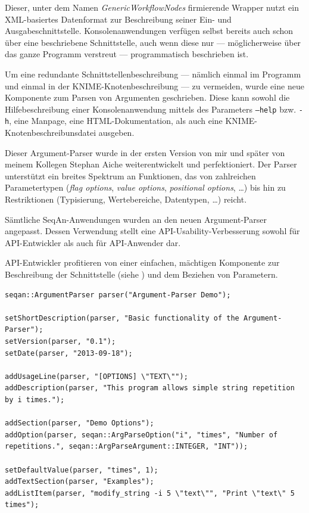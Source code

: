 Dieser, unter dem Namen \textit{GenericWorkflowNodes} firmierende Wrapper nutzt ein XML-basiertes Datenformat zur Beschreibung seiner Ein- und Ausgabeschnittstelle. Konsolenanwendungen verfügen selbst bereits auch schon über eine beschriebene Schnittstelle, auch wenn diese nur --- möglicherweise über das ganze Programm verstreut --- programmatisch beschrieben ist.

Um eine redundante Schnittstellenbeschreibung --- nämlich einmal im Programm und einmal in der KNIME-Knotenbeschreibung --- zu vermeiden, wurde eine neue Komponente zum Parsen von Argumenten geschrieben. Diese kann sowohl die Hilfebeschreibung einer Konsolenanwendung mittels des Parameters \texttt{--help} bzw. \texttt{-h}, eine Manpage, eine HTML-Dokumentation, als auch eine  KNIME-Knotenbeschreibunsdatei ausgeben.

Dieser Argument-Parser wurde in der ersten Version von mir und später von meinem Kollegen Stephan Aiche weiterentwickelt und perfektioniert. Der Parser unterstützt ein breites Spektrum an Funktionen, das von zahlreichen Parametertypen (\textit{flag options}, \textit{value options}, \textit{positional options}, \ldots) bis hin zu Restriktionen (Typisierung, Wertebereiche, Datentypen, \ldots) reicht.

Sämtliche SeqAn-Anwendungen wurden an den neuen Argument-Parser angepasst. Dessen Verwendung stellt eine API-Usability-Verbesserung sowohl für API-Entwickler als auch für API-Anwender dar.

\bigskip

\begin{samepage}
API-Entwickler profitieren von einer einfachen, mächtigen Komponente zur Beschreibung der Schnittstelle (siehe ) und dem Beziehen von Parametern.

\begin{center}
\begin{verbatim}
seqan::ArgumentParser parser("Argument-Parser Demo");

setShortDescription(parser, "Basic functionality of the Argument-Parser");
setVersion(parser, "0.1");
setDate(parser, "2013-09-18");

addUsageLine(parser, "[OPTIONS] \"TEXT\"");
addDescription(parser, "This program allows simple string repetition by i times.");

addSection(parser, "Demo Options");
addOption(parser, seqan::ArgParseOption("i", "times", "Number of repetitions.", seqan::ArgParseArgument::INTEGER, "INT"));

setDefaultValue(parser, "times", 1);
addTextSection(parser, "Examples");
addListItem(parser, "modify_string -i 5 \"text\"", "Print \"text\" 5 times");
\end{verbatim}
\label{lst:argparser-interface}
\end{center}
\end{samepage}

